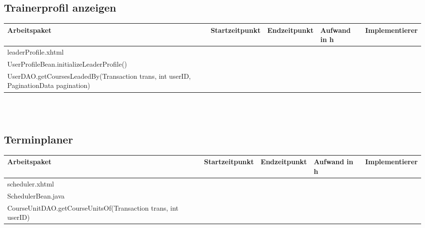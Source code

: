 \begin{landscape}
	\subsection{Trainerprofil anzeigen}	
	\begin{tabular}{|p{10cm}|p{4cm}|p{3cm}|p{3cm}|p{3cm}|}
		\hline  \textbf{Arbeitspaket} & \textbf{Startzeitpunkt} & \textbf{Endzeitpunkt} & \textbf{Aufwand in h} & \textbf{Implementierer} \\ 
		\hline   leaderProfile.xhtml                      &                            &                             &                     &\\
		\hline   UserProfileBean.initializeLeaderProfile()&                            &                             &                     &\\
		\hline   UserDAO.getCoursesLeadedBy(Transaction trans, int userID, PaginationData pagination)  &                            &                             &                     &\\
		\hline 
	\end{tabular} \ \\
	\ \\
	
	\subsection{Terminplaner}
	\begin{tabular}{|p{10cm}|p{4cm}|p{3cm}|p{3cm}|p{3cm}|}
		\hline  \textbf{Arbeitspaket} & \textbf{Startzeitpunkt} & \textbf{Endzeitpunkt} & \textbf{Aufwand in h} & \textbf{Implementierer} \\ 
		\hline   scheduler.xhtml                                 &                            &                             &                     &\\
		\hline   SchedulerBean.java                              &                            &                             &                     &\\
		\hline   CourseUnitDAO.getCourseUnitsOf(Transaction trans, int userID)  &                            &                             &                     &\\
		\hline 
	\end{tabular} \ \\
	\ \\
	

\end{landscape}
